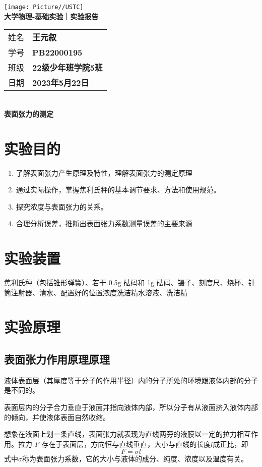 \documentclass[10pt,a4paper]{article}	%
\newcommand{\nexp}{表面张力的测定}
\begin{document}
	\vspace*{-5em}
	\begin{center}
		\texttt{[image: Picture//USTC]}\\
		\Large \textbf{大学物理-基础实验｜实验报告}\\[5mm]

		\normalsize
		\begin{tabular}{ll}
			姓名 & \textbf{王元叙}\\
			学号 & \textbf{PB22000195}\\
			班级 & \textbf{22级少年班学院5班}\\
			日期 & \textbf{2023年5月22日}\\	
		\end{tabular}\\[5mm]

		\LARGE \textbf{\nexp}\\[5mm]	

	\end{center}

	\section{实验目的}

	\begin{enumerate}
		\item 了解表面张力产生原理及特性，理解表面张力的测定原理
		\item 通过实际操作，掌握焦利氏秤的基本调节要求、方法和使用规范。
		\item 探究浓度与表面张力的关系。
		\item 合理分析误差，推断出表面张力系数测量误差的主要来源
	\end{enumerate}


	\section{实验装置}
	焦利氏秤（包括锥形弹簧）、若干 0.5g 砝码和 1g 砝码、镊子、刻度尺、烧杯、针筒注射器、清水、配置好的位置浓度洗洁精水溶液、洗洁精

	\section{实验原理}

	\subsection{表面张力作用原理原理}
    液体表面层（其厚度等于分子的作用半径）内的分子所处的环境跟液体内部的分子是不同的。\par
	表面层内的分子合力垂直于液面并指向液体内部，所以分子有从液面挤入液体内部的倾向，并使液体表面自然收缩。\par
	想象在液面上划一条直线，表面张力就表现为直线两旁的液膜以一定的拉力相互作用。拉力 $F$ 存在于表面层，方向恒与直线垂直，大小与直线的长度$l$成正比，即
	\[F=\sigma l\]
	式中$\sigma$称为表面张力系数，它的大小与液体的成分、纯度、浓度以及温度有关。
\end{document}
